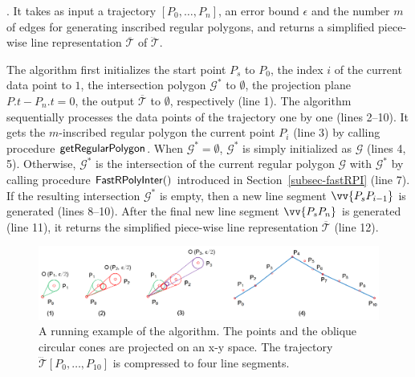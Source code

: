 . It takes as input a trajectory ${[P_0, \ldots, P_n]}$, an error bound $\epsilon$ and the number $m$ of edges for generating inscribed regular polygons, and returns a simplified  piece-wise line representation $\overline{\mathcal{T}}$ of $\dddot{\mathcal{T}}$.



The algorithm first initializes the start point $P_s$ to $P_0$, the index $i$ of the current data point to $1$, the intersection polygon $\mathcal{G}^*$ to $\emptyset$, the projection plane $P.t - P_n.t = 0$, the output $\overline{\mathcal{T}}$ to $\emptyset$, respectively (line 1).
%
The algorithm sequentially processes the data points of the trajectory one by one  (lines 2--10). It gets the $m$-inscribed regular polygon \wrt the current point $P_i$ (line 3) by calling procedure ${\mathsf{getRegularPolygon}}$. When $\mathcal{G}^* = \emptyset$, $\mathcal{G}^*$ is simply initialized as $\mathcal{G}$ (lines 4, 5). Otherwise,
$\mathcal{G}^*$ is  the intersection of the current regular polygon $\mathcal{G}$ with $\mathcal{G}^*$ by calling procedure ${\mathsf{FastRPolyInter}}()$ introduced in Section~\ref{subsec-fastRPI} (line 7). If the resulting intersection $\mathcal{G}^*$ is empty, then a new line segment $\vv{P_sP_{i-1}}$ is generated (lines 8--10).
After the  final new line segment $\vv{P_sP_{n}}$ is generated (line 11), it returns the simplified  piece-wise line representation $\overline{\mathcal{T}}$ (line 12).




\begin{figure}[tb!]
\centering
\includegraphics[scale=0.8]{figures/Fig-ex-conest.png}
\vspace{-1ex}
\caption{\small A running example of the \cist algorithm. The points and the oblique circular cones are projected on an x-y space. The trajectory $\dddot{\mathcal{T}}[P_0, \ldots, P_{10}]$ is compressed to four line segments.}
\vspace{-2ex}
\label{fig:exm-const}
\end{figure}




